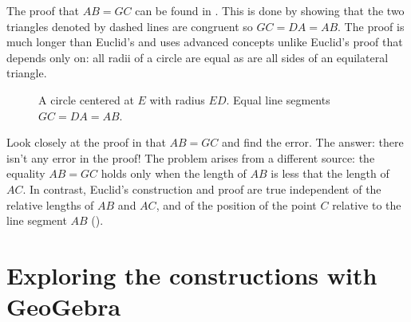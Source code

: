 The proof that $AB=GC$ can be found in \cite{rusty}. This is done by showing that the two triangles denoted by dashed lines are congruent so $GC=DA=AB$. The proof is much longer than Euclid's and uses advanced concepts unlike Euclid's proof that depends only on: all radii of a circle are equal as are all sides of an equilateral triangle.
\begin{figure}[H]
\begin{center}
\caption{A circle centered at $E$ with radius $ED$. Equal line segments $GC=DA=AB$.}\label{fig.rusty-3}
\end{center}
\end{figure}
\vspace*{-3ex}
Look closely at the proof in \cite{rusty} that $AB=GC$ and find the error. The answer: there isn't any error in the proof! The problem arises from a different source: the equality $AB=GC$ holds only when the length of $AB$ is less that the length of $AC$. In contrast, Euclid's construction and proof are true independent of the relative lengths of  $AB$ and $AC$, and of the position of the point $C$ relative to the line segment $AB$ (\cite{toussaint}).



\section{Exploring the constructions with GeoGebra}

